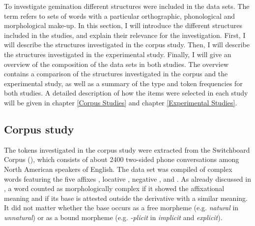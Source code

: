 To investigate {gemination} different structures were included in the data sets. The term  refers to sets of words with a particular orthographic, phonological and morphological make-up. In this section, I will introduce the different structures included in the studies, and explain their relevance for the investigation.
 First, I will describe the structures investigated in the corpus study. Then, I will describe the structures investigated in the experimental study. Finally, I will give an overview of the composition of the data sets in both studies. The overview contains a comparison of the structures investigated in the corpus and the experimental study, as well as a summary of the type and token frequencies for both studies. A detailed description of how the items were selected in each study will be given in chapter \ref{Corpus Studies} and chapter \ref{Experimental Studies}.


\subsection{Corpus study}\label{corpus data composition}

The tokens investigated in the corpus study were extracted from the Switchboard Corpus (\citealt{Godfrey.1997}), which consists of about 2400 two-sided phone conversations among North American speakers of English.  The data set was compiled of complex words featuring the five affixes , locative , negative ,  and . As already discussed in ,  a word counted as morphologically complex if it showed the affixational meaning and if its base is attested outside the derivative with a similar meaning. It did not matter whether the base occurs as a free morpheme (e.g. \textit{natural} in \textit{unnatural}) or as a bound morpheme (e.g. \textit{-plicit} in \textit{implicit}  and  \textit{explicit}). 


